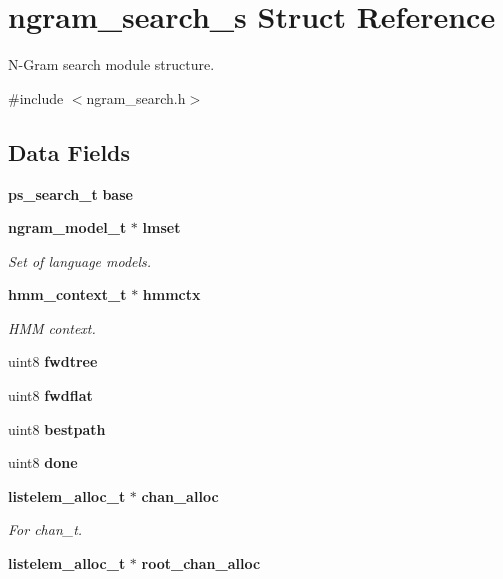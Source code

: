 \section{ngram\-\_\-search\-\_\-s Struct Reference}
\label{structngram__search__s}


N-\/\-Gram search module structure.  




{\ttfamily \#include $<$ngram\-\_\-search.\-h$>$}

\subsection*{Data Fields}
\begin{DoxyCompactItemize}
\item 
{\bf ps\-\_\-search\-\_\-t} {\bfseries base}\label{structngram__search__s_a572ad45de5b0f364096f0a8544fe5bf7}

\item 
{\bf ngram\-\_\-model\-\_\-t} $\ast$ {\bf lmset}
\begin{DoxyCompactList}\small\item\em Set of language models. \end{DoxyCompactList}\item 
{\bf hmm\-\_\-context\-\_\-t} $\ast$ {\bf hmmctx}
\begin{DoxyCompactList}\small\item\em H\-M\-M context. \end{DoxyCompactList}\item 
uint8 {\bfseries fwdtree}\label{structngram__search__s_aca37c8278a0dacb881cc6a2b0953c076}

\item 
uint8 {\bfseries fwdflat}\label{structngram__search__s_a88358958f4f983c96034cbbd4bc8f5cd}

\item 
uint8 {\bfseries bestpath}\label{structngram__search__s_a0d1daeb151911b2243a1a91566be9063}

\item 
uint8 {\bfseries done}\label{structngram__search__s_a3c51a66cf26de3aa050b3615d14ff060}

\item 
{\bf listelem\-\_\-alloc\-\_\-t} $\ast$ {\bf chan\-\_\-alloc}\label{structngram__search__s_abe9fe60f6e48b9a6e3d41856bb1dc109}

\begin{DoxyCompactList}\small\item\em For chan\-\_\-t. \end{DoxyCompactList}\item 
{\bf listelem\-\_\-alloc\-\_\-t} $\ast$ {\bf root\-\_\-chan\-\_\-alloc}\label{structngram__search__s_a576470858bfa44c671f0e677902ab424}


\end{DoxyCompactItemize}
